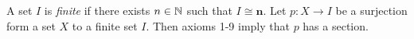  A set $I$ is \textit{finite} if there exists $n \in \operatorname{\mathbb{N}}$ such that $I \cong \mathbf{n}$.
 Let $p \colon X \to I$ be a surjection form a set $X$ to a finite set $I$. Then axioms 1-9 imply that $p$ has a section.
